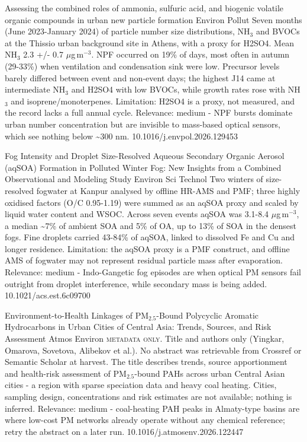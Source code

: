 \documentclass[10pt]{article}
\begin{document}
{Assessing the combined roles of ammonia, sulfuric acid, and biogenic volatile organic compounds in urban new particle formation}
{Environ Pollut}
{Seven months (June 2023-January 2024) of particle number size distributions, NH$_3$ and BVOCs at the Thissio urban background site in Athens, with a proxy for H2SO4. Mean NH$_3$ 2.3 +/- 0.7 $\mu$g\,m$^{-3}$. NPF occurred on 19\% of days, most often in autumn (29-33\%) when ventilation and condensation sink were low. Precursor levels barely differed between event and non-event days; the highest J14 came at intermediate NH$_3$ and H2SO4 with low BVOCs, while growth rates rose with NH$_3$ and isoprene/monoterpenes. Limitation: H2SO4 is a proxy, not measured, and the record lacks a full annual cycle. Relevance: medium - NPF bursts dominate urban number concentration but are invisible to mass-based optical sensors, which see nothing below \textasciitilde{}300 nm.}
{10.1016/j.envpol.2026.129453}

{Fog Intensity and Droplet Size-Resolved Aqueous Secondary Organic Aerosol (aqSOA) Formation in Polluted Winter Fog: New Insights from a Combined Observational and Modeling Study}
{Environ Sci Technol}
{Two winters of size-resolved fogwater at Kanpur analysed by offline HR-AMS and PMF; three highly oxidised factors (O/C 0.95-1.19) were summed as an aqSOA proxy and scaled by liquid water content and WSOC. Across seven events aqSOA was 3.1-8.4 $\mu$g\,m$^{-3}$, a median \textasciitilde{}7\% of ambient SOA and 5\% of OA, up to 13\% of SOA in the densest fogs. Fine droplets carried 43-84\% of aqSOA, linked to dissolved Fe and Cu and longer residence. Limitation: the aqSOA proxy is a PMF construct, and offline AMS of fogwater may not represent residual particle mass after evaporation. Relevance: medium - Indo-Gangetic fog episodes are when optical PM sensors fail outright from droplet interference, while secondary mass is being added.}
{10.1021/acs.est.6c09700}

{Environment-to-Health Linkages of PM$_{2.5}$-Bound Polycyclic Aromatic Hydrocarbons in Urban Cities of Central Asia: Trends, Sources, and Risk Assessment}
{Atmos Environ}
{\textsc{metadata only.} Title and authors only (Yingkar, Omarova, Sovetova, Alibekov et al.). No abstract was retrievable from Crossref or Semantic Scholar at harvest. The title describes trends, source apportionment and health-risk assessment of PM$_{2.5}$-bound PAHs across urban Central Asian cities - a region with sparse speciation data and heavy coal heating. Cities, sampling design, concentrations and risk estimates are not available; nothing is inferred. Relevance: medium - coal-heating PAH peaks in Almaty-type basins are where low-cost PM networks already operate without any chemical reference; retry the abstract on a later run.}
{10.1016/j.atmosenv.2026.122447}
\end{document}
